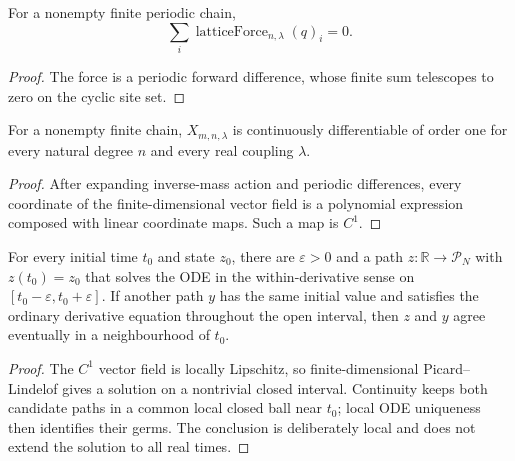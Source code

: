 \begin{theorem}
\label{thm:microscopic:sum-lattice-force}
For a nonempty finite periodic chain,
\[
  \sum_i \operatorname{latticeForce}_{n,\lambda}(q)_i=0.
\]
\end{theorem}
\begin{proof}

\leanok
The force is a periodic forward difference, whose finite sum telescopes to
zero on the cyclic site set.
\end{proof}

\begin{theorem}
\label{thm:microscopic:vector-field-contdiff}
For a nonempty finite chain, $X_{m,n,\lambda}$ is continuously differentiable
of order one for every natural degree $n$ and every real coupling $\lambda$.
\end{theorem}
\begin{proof}

\leanok
After expanding inverse-mass action and periodic differences, every coordinate
of the finite-dimensional vector field is a polynomial expression composed
with linear coordinate maps.  Such a map is $C^1$.
\end{proof}

\begin{theorem}
\label{thm:microscopic:local-solution-germ}
For every initial time $t_0$ and state $z_0$, there are $\varepsilon>0$ and a
path $z:\mathbb R\to\mathcal P_N$ with $z(t_0)=z_0$ that solves the ODE in the
within-derivative sense on
$[t_0-\varepsilon,t_0+\varepsilon]$.  If another path $y$ has the same initial
value and satisfies the ordinary derivative equation throughout the open
interval, then $z$ and $y$ agree eventually in a neighbourhood of $t_0$.
\end{theorem}
\begin{proof}

\leanok
The $C^1$ vector field is locally Lipschitz, so finite-dimensional
Picard--Lindelof gives a solution on a nontrivial closed interval.  Continuity
keeps both candidate paths in a common local closed ball near $t_0$; local ODE
uniqueness then identifies their germs.  The conclusion is deliberately local
and does not extend the solution to all real times.
\end{proof}

